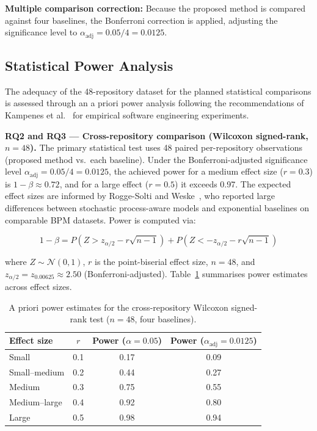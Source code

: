 \textbf{Multiple comparison correction:} Because the proposed method is 
compared against four baselines, the Bonferroni correction is applied, 
adjusting the significance level to $\alpha_{\text{adj}} = 0.05 / 4 = 0.0125$.


\subsection{Statistical Power Analysis}
\label{sec:power-analysis}

The adequacy of the 48-repository dataset for the planned statistical
comparisons is assessed through an a priori power analysis following
the recommendations of Kampenes et al.~\cite{kampenes2007systematic}
for empirical software engineering experiments.

\textbf{RQ2 and RQ3 — Cross-repository comparison (Wilcoxon
signed-rank, $n = 48$).}
The primary statistical test uses 48 paired per-repository observations
(proposed method vs.\ each baseline). Under the Bonferroni-adjusted
significance level $\alpha_{\text{adj}} = 0.05 / 4 = 0.0125$, the
achieved power for a medium effect size ($r = 0.3$) is
$1 - \beta \approx 0.72$, and for a large effect ($r = 0.5$) it
exceeds 0.97. The expected effect sizes are informed by Rogge-Solti
and Weske~\cite{RoggeSolti2015NonMarkovianSPN}, who reported large
differences between stochastic process-aware models and exponential
baselines on comparable BPM datasets. Power is computed via:

\begin{equation}
\label{eq:power}
1 - \beta =
P\!\left(Z > z_{\alpha/2} - r\sqrt{n-1}\right) +
P\!\left(Z < -z_{\alpha/2} - r\sqrt{n-1}\right)
\end{equation}

\noindent where $Z \sim \mathcal{N}(0,1)$, $r$ is the point-biserial
effect size, $n = 48$, and $z_{\alpha/2} = z_{0.00625} \approx 2.50$
(Bonferroni-adjusted). Table~\ref{tab:power-analysis} summarises power
estimates across effect sizes.

\begin{table}[htbp]
\centering
\caption{A priori power estimates for the cross-repository Wilcoxon
  signed-rank test ($n = 48$, four baselines).}
\label{tab:power-analysis}
\small
\begin{tabular}{lccc}
\toprule
\textbf{Effect size} & \textbf{$r$} &
  \textbf{Power ($\alpha = 0.05$)} &
  \textbf{Power ($\alpha_{\text{adj}} = 0.0125$)} \\
\midrule
Small            & 0.1 & 0.17 & 0.09 \\
Small--medium    & 0.2 & 0.44 & 0.27 \\
Medium           & 0.3 & 0.75 & 0.55 \\
Medium--large    & 0.4 & 0.92 & 0.80 \\
Large            & 0.5 & 0.98 & 0.94 \\
\bottomrule
\end{tabular}
\end{table}


